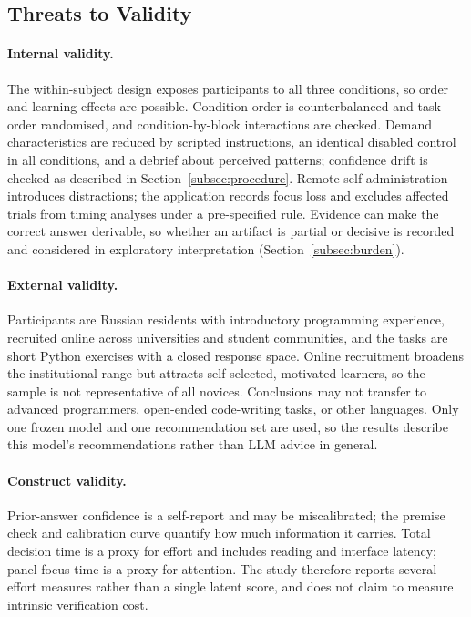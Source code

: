 \documentclass[oneside,final,14pt,a4paper]{extreport}
\begin{document}
\subsection{Threats to Validity}
\label{subsec:threats}

\paragraph{Internal validity.}
The within-subject design exposes participants to all three conditions, so
order and learning effects are possible. Condition order is counterbalanced and
task order randomised, and condition-by-block interactions are checked. Demand
characteristics are reduced by scripted instructions, an identical disabled
control in all conditions, and a debrief about perceived patterns; confidence
drift is checked as described in Section~\ref{subsec:procedure}. Remote
self-administration introduces distractions; the application records focus loss
and excludes affected trials from timing analyses under a pre-specified rule.
Evidence can make the correct answer derivable, so whether an artifact is partial
or decisive is recorded and considered in exploratory interpretation
(Section~\ref{subsec:burden}).

\paragraph{External validity.}
Participants are Russian residents with introductory programming experience,
recruited online across universities and student communities, and the tasks are
short Python exercises with a closed response space. Online recruitment broadens
the institutional range but attracts self-selected, motivated learners, so the
sample is not representative of all novices. Conclusions may not transfer to
advanced programmers, open-ended code-writing tasks, or other languages. Only
one frozen model and one recommendation set are used, so the results describe
this model's recommendations rather than LLM advice in general.

\paragraph{Construct validity.}
Prior-answer confidence is a self-report and may be miscalibrated; the premise
check and calibration curve quantify how much information it carries. Total
decision time is a proxy for effort and includes reading and interface latency;
panel focus time is a proxy for attention. The study therefore reports several
effort measures rather than a single latent score, and does not claim to measure
intrinsic verification cost.
\end{document}

